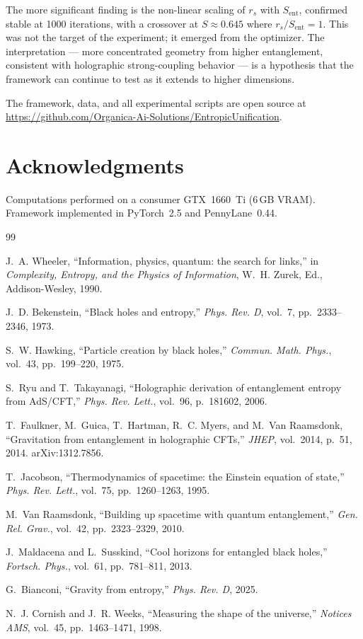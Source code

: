 \documentclass[12pt,a4paper]{article}
\newcommand{\Sent}{S_{\mathrm{ent}}}
\newcommand{\rs}{r_s}
\begin{document}
The more significant finding is the non-linear scaling of $\rs$ with $\Sent$,
confirmed stable at 1000 iterations, with a crossover at $S\approx 0.645$
where $\rs/\Sent=1$. This was not the target of the experiment; it emerged
from the optimizer. The interpretation --- more concentrated geometry from
higher entanglement, consistent with holographic strong-coupling behavior ---
is a hypothesis that the framework can continue to test as it extends to
higher dimensions.

The framework, data, and all experimental scripts are open source at
\url{https://github.com/Organica-Ai-Solutions/EntropicUnification}.

\section*{Acknowledgments}

Computations performed on a consumer GTX~1660~Ti (6\,GB VRAM).
Framework implemented in PyTorch~2.5 and PennyLane~0.44.


\begin{thebibliography}{99}

J.~A. Wheeler,
``Information, physics, quantum: the search for links,''
in \emph{Complexity, Entropy, and the Physics of Information},
W.~H. Zurek, Ed., Addison-Wesley, 1990.

J.~D. Bekenstein,
``Black holes and entropy,''
\emph{Phys. Rev. D}, vol.~7, pp.~2333--2346, 1973.

S.~W. Hawking,
``Particle creation by black holes,''
\emph{Commun. Math. Phys.}, vol.~43, pp.~199--220, 1975.

S.~Ryu and T.~Takayanagi,
``Holographic derivation of entanglement entropy from AdS/CFT,''
\emph{Phys. Rev. Lett.}, vol.~96, p.~181602, 2006.

T.~Faulkner, M.~Guica, T.~Hartman, R.~C. Myers, and M.~Van Raamsdonk,
``Gravitation from entanglement in holographic CFTs,''
\emph{JHEP}, vol.~2014, p.~51, 2014.
arXiv:1312.7856.

T.~Jacobson,
``Thermodynamics of spacetime: the Einstein equation of state,''
\emph{Phys. Rev. Lett.}, vol.~75, pp.~1260--1263, 1995.

M.~Van Raamsdonk,
``Building up spacetime with quantum entanglement,''
\emph{Gen. Rel. Grav.}, vol.~42, pp.~2323--2329, 2010.

J.~Maldacena and L.~Susskind,
``Cool horizons for entangled black holes,''
\emph{Fortsch. Phys.}, vol.~61, pp.~781--811, 2013.

G.~Bianconi,
``Gravity from entropy,''
\emph{Phys. Rev. D}, 2025.

N.~J. Cornish and J.~R. Weeks,
``Measuring the shape of the universe,''
\emph{Notices AMS}, vol.~45, pp.~1463--1471, 1998.

\end{thebibliography}
\end{document}
